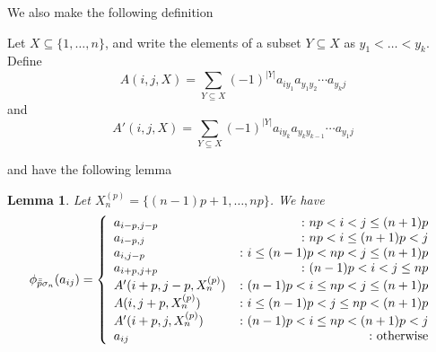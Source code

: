 \documentclass[11pt]{amsart}
\def\s{{\sigma}}
\def\fp{{\scriptstyle \bar{\bar{p}}}}
\newtheorem{lem}[thm]{Lemma}
\theoremstyle{definition}
\begin{document}
\noindent We also make the following definition

\noindent Let $X\subseteq \{1,\ldots,n\}$, and write the elements of a subset $Y\subseteq X$ as $y_1<\ldots <y_k$.  Define
$$
 A(i,j,X) = \sum_{Y\subseteq X}(-1)^{|Y|}a_{iy_1}a_{y_1y_2}\cdots a_{y_kj}
$$
and
$$
 A'(i,j,X) = \sum_{Y\subseteq X}(-1)^{|Y|}a_{iy_k}a_{y_ky_{k-1}}\cdots a_{y_1j}
$$



\noindent and have the following lemma

\begin{lem}\label{Sigma_n}
Let $X_n^{(p)} = \{(n-1)p+1,\ldots,np\}$.  We have
$$
\phi_{\fp\s_n}(a_{ij}) =
\left\{
     \begin{array}{lr}
       a_{i-p,j-p} & \colon np< i<j\le (n+1)p\\
       a_{i-p,j} &\colon np< i\le (n+1)p< j\\
       a_{i,j-p} & \colon i\le(n-1)p<np< j\le(n+1)p\\
       a_{i+p,j+p} &\colon (n-1)p< i<j\le np\\
       A'(i+p,j-p,X_n^{(p)}) & \colon (n-1)p< i\le np< j \le (n+1)p\\
       A(i,j+p,X_n^{(p)}) & \colon i\le(n-1)p< j \le np<(n+1)p\\
       A'(i+p,j,X_n^{(p)}) & \colon (n-1)p< i \le np<(n+1)p< j\\
       a_{ij} & \colon \textnormal{otherwise}
     \end{array}
\right.
$$
\end{lem}
\end{document}
